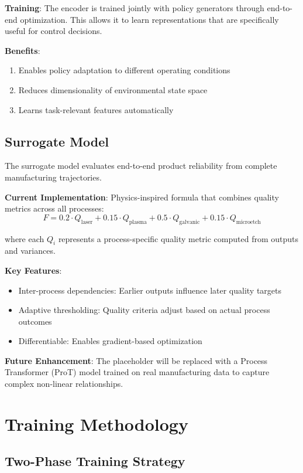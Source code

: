 \documentclass[11pt,a4paper]{article}
\begin{document}
\textbf{Training}: The encoder is trained jointly with policy generators through end-to-end optimization. This allows it to learn representations that are specifically useful for control decisions.

\textbf{Benefits}:
\begin{enumerate}
    \item Enables policy adaptation to different operating conditions
    \item Reduces dimensionality of environmental state space
    \item Learns task-relevant features automatically
\end{enumerate}

\subsection{Surrogate Model}

The surrogate model evaluates end-to-end product reliability from complete manufacturing trajectories.

\textbf{Current Implementation}: Physics-inspired formula that combines quality metrics across all processes:
$$
F = 0.2 \cdot Q_{\text{laser}} + 0.15 \cdot Q_{\text{plasma}} + 0.5 \cdot Q_{\text{galvanic}} + 0.15 \cdot Q_{\text{microetch}}
$$

where each $Q_i$ represents a process-specific quality metric computed from outputs and variances.

\textbf{Key Features}:
\begin{itemize}
    \item Inter-process dependencies: Earlier outputs influence later quality targets
    \item Adaptive thresholding: Quality criteria adjust based on actual process outcomes
    \item Differentiable: Enables gradient-based optimization
\end{itemize}

\textbf{Future Enhancement}: The placeholder will be replaced with a Process Transformer (ProT) model trained on real manufacturing data to capture complex non-linear relationships.

\section{Training Methodology}

\subsection{Two-Phase Training Strategy}
\end{document}
